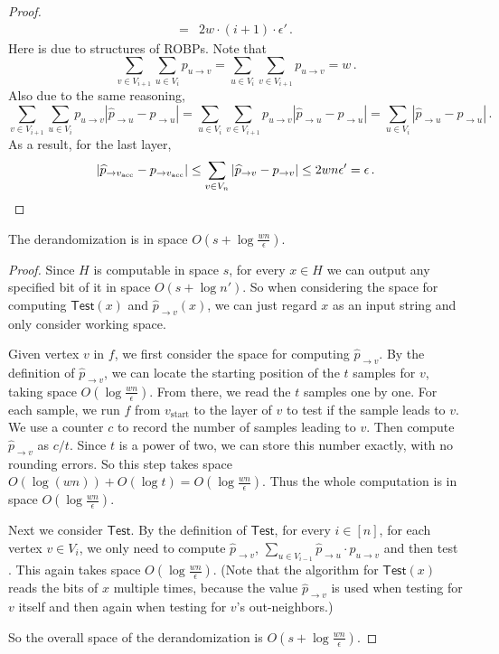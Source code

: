 \begin{proof}
\begin{align}
={} & 2w \cdot (i + 1) \cdot \epsilon'\,. \nonumber
\end{align}
Here  is due to  structures of ROBPs. Note that 
$$\sum_{v\in V_{i+1}} \sum_{u\in V_i} p_{u \to v} =  \sum_{u\in V_i} \sum_{v\in V_{i+1}} p_{u \to v}  = w\,.$$ 
Also due to the same reasoning,
$$\sum_{v\in V_{i+1}} \sum_{u\in V_i} p_{u \to v}|\widehat{p}_{ \to u} - p_{ \to u}| = \sum_{u\in V_i} \sum_{v\in V_{i+1}} p_{u \to v} |\widehat{p}_{ \to u} - p_{ \to u}| = \sum_{u\in V_i} |\widehat{p}_{ \to u} -p_{ \to u}|\,.$$
As a result, for the last layer,
\[ |\widehat{p}_{\to v_{\text{acc}}} - p_{ \to v_{\text{acc}}}| \leq \sum_{v\in  V_{n }} |\widehat{p}_{\to v} - p_{ \to v}| \leq 2wn \epsilon' = \epsilon\,. \qedhere \]
\end{proof}


\begin{lemma} \label{lem:DrandIsInLogspace}
The derandomization is in space $O(s+\log \frac{wn}{\epsilon})$.
\end{lemma}

\begin{proof}
Since $H$ is computable in space $s$, for every $x\in H$ we can output any specified bit of it in space $O(s+\log n')$. So when considering the space for computing $ \mathsf{Test}(x)$ and $ \widehat{p}_{\to v}(x)$, we can just regard $x$ as an input string and only consider working space.

Given vertex $v$ in $f$, we first consider the space for computing $\widehat{p}_{\to v}$. By the definition of $\widehat{p}_{\to v}$, we can locate the starting position of the $t$ samples for $v$, taking space $O(\log \frac{wn}{\epsilon})$. From there, we read the $t$ samples one by one. For each sample, we run $f$ from $v_{\text{start}}$ to the layer of $v$ to test if the sample leads to $v$. We use a counter $c$ to record the number of samples leading to $v$. Then compute $\widehat{p}_{\to v}$ as $c/t$. Since $t$ is a power of two, we can store this number exactly, with no rounding errors. So this step takes space $O(\log (wn))+O(\log t) =  O(\log \frac{wn}{\epsilon})$. Thus the whole computation is in space $O(\log \frac{wn}{\epsilon})$.

Next we consider $\mathsf{Test}$. By the definition of $\mathsf{Test}$, for every $i\in [n]$, for each vertex $v \in V_i$, we only need to compute $\widehat{p}_{\to v}$, $ \sum_{u \in V_{i-1} } \widehat{p}_{\to u} \cdot p_{u \to v} $ and then test . This again takes space $O(\log \frac{wn}{\epsilon})$. (Note that the algorithm for $\mathsf{Test}(x)$ reads the bits of $x$ multiple times, because the value $\widehat{p}_{\to v}$ is used when testing  for $v$ itself and then again when testing  for $v$'s out-neighbors.)

So the overall space of the derandomization is $O(s+\log \frac{wn}{\epsilon})$.
\end{proof}

